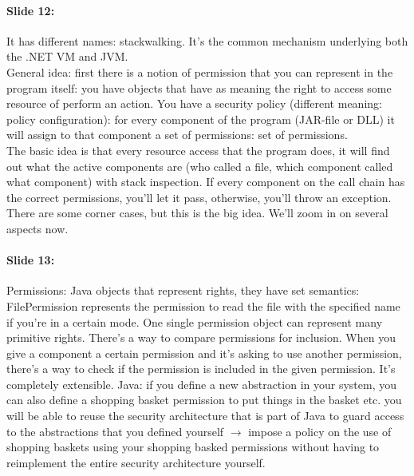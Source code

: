 \documentclass[10pt,a4paper]{report}
\begin{document}
\paragraph{Slide 12:} It has different names: stackwalking. It's the common mechanism underlying both the .NET VM and JVM. \\
General idea: first there is a notion of permission that you can represent in the program itself: you have objects that have as meaning the right to access some resource of perform an action. You have a security policy (different meaning: policy configuration): for every component of the program (JAR-file or DLL) it will assign to that component a set of permissions: set of permissions.\\
The basic idea is that every resource access that the program does, it will find out what the active components are (who called a file, which component called what component) with stack inspection. If every component on the call chain has the correct permissions, you'll let it pass, otherwise, you'll throw an exception.\\
There are some corner cases, but this is the big idea. We'll zoom in on several aspects now.

\paragraph{Slide 13:} Permissions: Java objects that represent rights, they have set semantics: FilePermission represents the permission to read the file with the specified name if you're in a certain mode. One single permission object can represent many primitive rights. There's a way to compare permissions for inclusion. When you give a component a certain permission and it's asking to use another permission, there's a way to check if the permission is included in the given permission. It's completely extensible. Java: if you define a new abstraction in your system, you can also define a shopping basket permission to put things in the basket etc. you will be able to reuse the security architecture that is part of Java to guard access to the abstractions that you defined yourself $\rightarrow$ impose a policy on the use of shopping baskets using your shopping basked permissions without having to reimplement the entire security architecture yourself.
\end{document}
